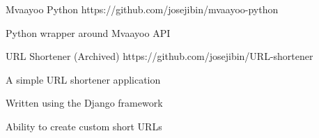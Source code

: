 

\begin{cvprojects}

\cvproject
    {Mvaayoo Python} %
    {https://github.com/josejibin/mvaayoo-python} %
    {
      \begin{cvitems} %
        \item{Python wrapper around Mvaayoo API}
      \end{cvitems}
    }


\cvproject
    {URL Shortener (Archived)} %
    {https://github.com/josejibin/URL-shortener} %
    {
      \begin{cvitems} %
        \item{A simple URL shortener application}
        \item {Written using the Django framework}
        \item {Ability to create custom short URLs}
      \end{cvitems}
    }





\end{cvprojects}
